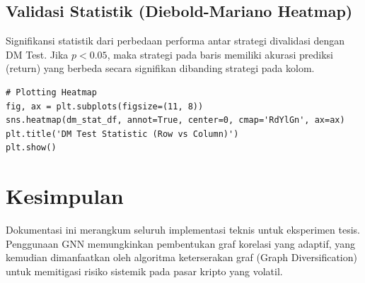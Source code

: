 \documentclass[12pt,a4paper]{article}
\begin{document}
\subsection{Validasi Statistik (Diebold-Mariano Heatmap)}
Signifikansi statistik dari perbedaan performa antar strategi divalidasi dengan DM Test. Jika $p < 0.05$, maka strategi pada baris memiliki akurasi prediksi (return) yang berbeda secara signifikan dibanding strategi pada kolom.

\begin{lstlisting}[caption={Visualisasi Heatmap Statistik}]
# Plotting Heatmap
fig, ax = plt.subplots(figsize=(11, 8))
sns.heatmap(dm_stat_df, annot=True, center=0, cmap='RdYlGn', ax=ax)
plt.title('DM Test Statistic (Row vs Column)')
plt.show()
\end{lstlisting}

\section{Kesimpulan}
Dokumentasi ini merangkum seluruh implementasi teknis untuk eksperimen tesis. Penggunaan GNN memungkinkan pembentukan graf korelasi yang adaptif, yang kemudian dimanfaatkan oleh algoritma keterserakan graf (Graph Diversification) untuk memitigasi risiko sistemik pada pasar kripto yang volatil.
\end{document}
